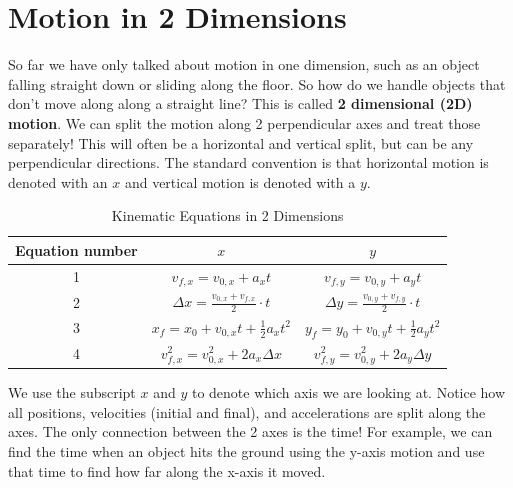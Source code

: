 \documentclass[12pt]{book}
\begin{document}
\section{Motion in 2 Dimensions}
\label{2Dmotion}

So far we have only talked about motion in one dimension, such as an object falling straight down or sliding along the floor. So how do we handle objects that don't move along along a straight line? This is called \textbf{2 dimensional (2D) motion}. We can split the motion along 2 perpendicular axes and treat those separately! This will often be a horizontal and vertical split, but can be any perpendicular directions. The standard convention is that horizontal motion is denoted with an $x$ and vertical motion is denoted with a $y$.

\begin{table}[b]
\large
\centering
\caption{Kinematic Equations in 2 Dimensions}
\label{kmtable}
\begin{tabular}{| c | c | c |}
	\hline
	Equation number & $x$ & $y$ \\
	\hline
	1 & $v_{f,x} = v_{0,x} + a_x t$ & $v_{f,y} = v_{0,y} + a_y t$ \\[5pt] \hline
	2 & $\Delta x = \frac{v_{0,x} + v_{f,x}}{2} \cdot t$ & $\Delta y = \frac{v_{0,y} + v_{f,y}}{2} \cdot t$ \\[5pt] \hline
	3 & $x_f = x_0 + v_{0,x} t + \frac{1}{2} a_x t^2$ & $y_f = y_0 + v_{0,y} t + \frac{1}{2} a_y t^2$ \\[5pt] \hline
	4 & $v_{f,x}^2 = v_{0,x}^2 + 2 a_x \Delta x$ & $v_{f,y}^2 = v_{0,y}^2 + 2 a_y \Delta y$ \\[5pt]
	\hline
\end{tabular}
\end{table}

We use the subscript $x$ and $y$ to denote which axis we are looking at. Notice how all positions, velocities (initial and final), and accelerations are split along the axes. The only connection between the 2 axes is the time! For example, we can find the time when an object hits the ground using the y-axis motion and use that time to find how far along the x-axis it moved.
\end{document}
